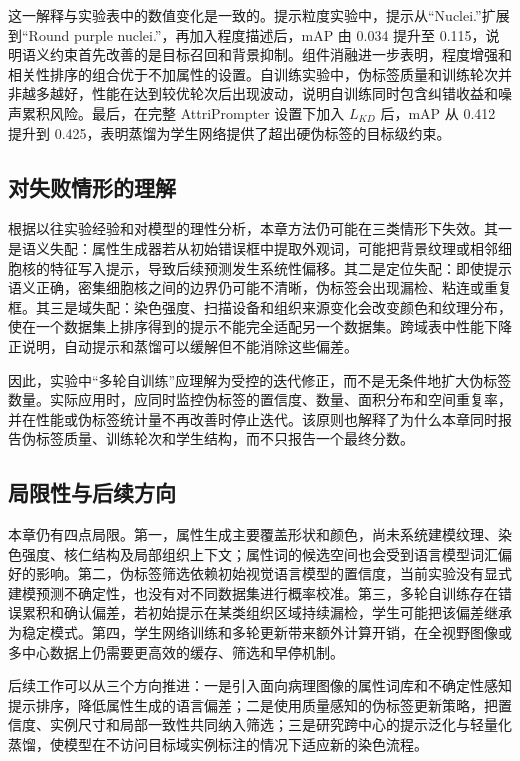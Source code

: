 这一解释与实验表中的数值变化是一致的。提示粒度实验中，提示从“Nuclei.”扩展到“Round purple nuclei.”，再加入程度描述后，mAP 由 0.034 提升至 0.115，说明语义约束首先改善的是目标召回和背景抑制。组件消融进一步表明，程度增强和相关性排序的组合优于不加属性的设置。自训练实验中，伪标签质量和训练轮次并非越多越好，性能在达到较优轮次后出现波动，说明自训练同时包含纠错收益和噪声累积风险。最后，在完整 AttriPrompter 设置下加入 $L_{KD}$ 后，mAP 从 0.412 提升到 0.425，表明蒸馏为学生网络提供了超出硬伪标签的目标级约束。

\subsection{对失败情形的理解}

根据以往实验经验和对模型的理性分析，本章方法仍可能在三类情形下失效。其一是语义失配：属性生成器若从初始错误框中提取外观词，可能把背景纹理或相邻细胞核的特征写入提示，导致后续预测发生系统性偏移。其二是定位失配：即使提示语义正确，密集细胞核之间的边界仍可能不清晰，伪标签会出现漏检、粘连或重复框。其三是域失配：染色强度、扫描设备和组织来源变化会改变颜色和纹理分布，使在一个数据集上排序得到的提示不能完全适配另一个数据集。跨域表中性能下降正说明，自动提示和蒸馏可以缓解但不能消除这些偏差。

因此，实验中“多轮自训练”应理解为受控的迭代修正，而不是无条件地扩大伪标签数量。实际应用时，应同时监控伪标签的置信度、数量、面积分布和空间重复率，并在性能或伪标签统计量不再改善时停止迭代。该原则也解释了为什么本章同时报告伪标签质量、训练轮次和学生结构，而不只报告一个最终分数。

\subsection{局限性与后续方向}

本章仍有四点局限。第一，属性生成主要覆盖形状和颜色，尚未系统建模纹理、染色强度、核仁结构及局部组织上下文；属性词的候选空间也会受到语言模型词汇偏好的影响。第二，伪标签筛选依赖初始视觉语言模型的置信度，当前实验没有显式建模预测不确定性，也没有对不同数据集进行概率校准。第三，多轮自训练存在错误累积和确认偏差，若初始提示在某类组织区域持续漏检，学生可能把该偏差继承为稳定模式。第四，学生网络训练和多轮更新带来额外计算开销，在全视野图像或多中心数据上仍需要更高效的缓存、筛选和早停机制。

后续工作可以从三个方向推进：一是引入面向病理图像的属性词库和不确定性感知提示排序，降低属性生成的语言偏差；二是使用质量感知的伪标签更新策略，把置信度、实例尺寸和局部一致性共同纳入筛选；三是研究跨中心的提示泛化与轻量化蒸馏，使模型在不访问目标域实例标注的情况下适应新的染色流程。

